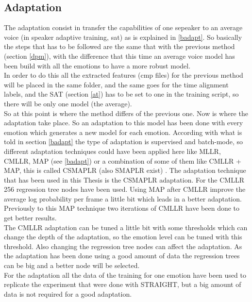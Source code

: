 \subsection{Adaptation}\label{adapt}
The adaptation consist in transfer the capabilities of one sepeaker to an average voice (in speaker adaptive training, sat) as is explained in \ref{badapt}.
So basically the steps that has to be followed are the same that with the previous method (section \ref{dpm}), with the difference that this time an average voice model has been build with all the emotions to have a more robust model.\\
In order to do this all the extracted features (cmp files) for the previous method will be placed in the same folder, and the same goes for the time alignment labels, and the SAT (section \ref{at}) has to be set to one in the training script, so there will be only one model (the average).\\
So at this point is where the method differs of the previous one. Now is where the adaptation take place. So an adaptation to this model has been done with every emotion which generates a new model for each emotion.
According with what is told in section \ref{badapt} the type of adaptation is supervised and batch-mode, so different adaptation techniques could have been applied here like MLLR, CMLLR, MAP (see \ref{badapt}) or a combination of some of them like CMLLR + MAP, this is called CSMAPLR (also SMAPLR exist) \cite{analysis-hts-adaptation-junichi}. The adaptation technique that has been used in this Thesis is the CSMAPLR adaptation. For the CMLLR 256 regression tree nodes have been used.
Using MAP after CMLLR improve the average log probability per frame a little bit which leads in a better adaptation. Previously to this MAP technique two iterations of CMLLR have been done to get better results.\\
The CMLLR adaptation can be tuned a little bit with some thresholds which can change the depth of the adaptation, so the emotion level can be tuned with this threshold. Also changing the regression tree nodes can affect the adaptation. As the adaptation has been done using a good amount of data the regression trees can be big and a better node will be selected.\\
For the adaptation all the data of the training for one emotion have been used to replicate the experiment that were done with STRAIGHT, but a big amount of data is not required for a good adaptation.
